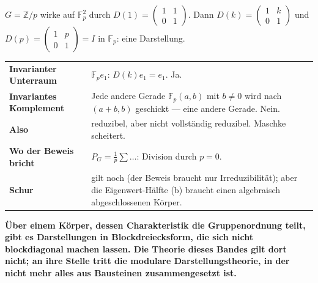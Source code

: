 \begin{warnung}
$G = \mathbb Z/p$ wirke auf $\mathbb F_p^{2}$ durch $D(1) = \begin{pmatrix}1 & 1\\ 0 & 1\end{pmatrix}$. Dann $D(k) = \begin{pmatrix}1 & k\\ 0 & 1\end{pmatrix}$ und $D(p) = \begin{pmatrix}1 & p\\ 0 & 1\end{pmatrix} = I$ in $\mathbb F_p$: eine Darstellung.
\begin{center}
{\small
\renewcommand{\arraystretch}{1.5}
\begin{tabular}{@{}P{3.2cm}P{5.4cm}@{}}
\toprule
\textbf{Invarianter Unterraum} & $\mathbb F_pe_1$: $D(k)e_1 = e_1$. Ja.\\
\textbf{Invariantes Komplement} & Jede andere Gerade $\mathbb F_p(a, b)$ mit $b\ne0$ wird nach $(a + b, b)$ geschickt --- eine andere Gerade. Nein.\\
\textbf{Also} & reduzibel, aber nicht vollständig reduzibel. Maschke scheitert.\\
\textbf{Wo der Beweis bricht} & $P_G = \frac1p\sum\ldots$: Division durch $p = 0$.\\
\textbf{Schur} & gilt noch (der Beweis braucht nur Irreduzibilität); aber die Eigenwert-Hälfte (b) braucht einen algebraisch abgeschlossenen Körper.\\
\bottomrule
\end{tabular}}
\end{center}

\begin{center}
\begin{minipage}{0.9\textwidth}
\textbf{Über einem Körper, dessen Charakteristik die Gruppenordnung teilt, gibt es Darstellungen in Blockdreiecksform, die sich nicht blockdiagonal machen lassen. Die Theorie dieses Bandes gilt dort nicht; an ihre Stelle tritt die modulare Darstellungstheorie, in der nicht mehr alles aus Bausteinen zusammengesetzt ist.}
\end{minipage}
\end{center}


\end{warnung}

